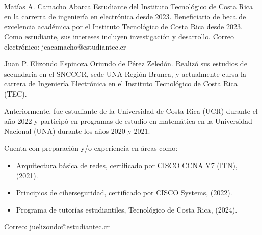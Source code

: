 \documentclass[journal]{IEEEtran}
\begin{document}
\section{}
\vspace{-1.2cm}
\begin{IEEEbiographynophoto}{Matías A. Camacho Abarca}
        Estudiante del Instituto Tecnológico de Costa Rica en la carrerra de ingeniería en electrónica desde
        2023. Beneficiario de beca de excelencia académica por el Instituto Tecnológico de
        Costa Rica desde 2023. Como estudiante, sus
        intereses incluyen investigación y desarrollo.
        Correo electrónico: jeacamacho@estudiantec.cr
\end{IEEEbiographynophoto}
\vspace{-1.2cm}
\begin{IEEEbiographynophoto}{Juan P. Elizondo Espinoza}
        Oriundo de Pérez Zeledón. Realizó sus estudios de secundaria en el SNCCCR, sede UNA Región Brunca, y actualmente cursa la carrera de Ingeniería Electrónica en el Instituto Tecnológico de Costa Rica (TEC). 
        
        Anteriormente, fue estudiante de la Universidad de Costa Rica (UCR) durante el año 2022 y participó en programas de estudio en matemática en la Universidad Nacional (UNA) durante los años 2020 y 2021. 
        
        Cuenta con preparación y/o experiencia en áreas como:
        \begin{itemize}
            \item Arquitectura básica de redes, certificado por CISCO CCNA V7 (ITN), (2021).
            \item Principios de ciberseguridad, certificado por CISCO Systems, (2022).
            \item Programa de tutorías estudiantiles, Tecnológico de Costa Rica, (2024).
        \end{itemize}
        
        Correo: juelizondo@estudiantec.cr
\end{IEEEbiographynophoto}



\end{document}
